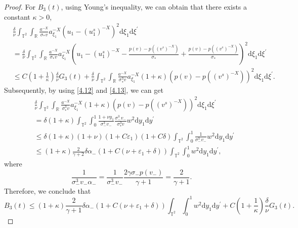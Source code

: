 \documentclass[10pt,reqno]{amsart}
\numberwithin{equation}{section}
\newcommand{\dif}{\mathrm{d}}
\begin{document}
\begin{proof}
For $B_3(t)$, using Young's inequality, we can obtain that there exists a constant $\kappa>0$,
\begin{align*}
&\frac{\delta}{\nu}\int_{\mathbb{T}^2}\int_{\mathbb{R}}\frac{a^{-X}}{\sigma_\ast v}a^{-X}_{\xi_1}\left(u_1-(u_1^s)^{-X}\right)^2\dif \xi_1\dif \xi^{\prime}\\
&=\frac{\delta}{\nu}\int_{\mathbb{T}^2}\int_{\mathbb{R}}\frac{a^{-X}}{\sigma_\ast v}a^{-X}_{\xi_1}\left(u_1-(u_1^s)^{-X}-\frac{p(v)-p((v^s)^{-X})}{\sigma_\ast}
+\frac{p(v)-p((v^s)^{-X})}{\sigma_\ast}\right)^2\dif \xi_1\dif \xi^{\prime}\\
&\le C(1+\frac{1}{\kappa})\frac{\delta}{\nu}G_3(t)+
\frac{\delta}{\nu}\int_{\mathbb{T}^2}\int_{\mathbb{R}}\frac{a^{-X}}{\sigma_\ast^3 v}a^{-X}_{\xi_1}(1+\kappa)\left(p(v)-p((v^s)^{-X})\right)^2\dif \xi_1\dif \xi^{\prime}.
\end{align*}
Subsequently, by using \eqref{4.12} and \eqref{4.13}, we can get
\begin{align*}
&\frac{\delta}{\nu}\int_{\mathbb{T}^2}\int_{\mathbb{R}}\frac{a^{-X}}{\sigma_\ast^3 v}a^{-X}_{\xi_1}(1+\kappa)\left(p(v)-p((v^s)^{-X})\right)^2\dif \xi_1\dif \xi^{\prime}\\
&=\delta(1+\kappa)\int_{\mathbb{T}^2}\int_0^1\frac{1+\nu y_1}{\sigma_-^3 v_-}\frac{\sigma_-^3v_-}{\sigma_\ast^3v}w^2\dif y_1\dif y^{\prime}\\
&\le \delta(1+\kappa)(1+\nu)(1+C\varepsilon_1)(1+C\delta)\int_{\mathbb{T}^2}\int_0^1\frac{1}{\sigma_-^3 v_-}w^2\dif y_1\dif y^{\prime}\\
&\le (1+\kappa)\frac{2}{\gamma+2}\delta\alpha_-(1+C(\nu+\varepsilon_1+\delta))
\int_{\mathbb{T}^2}\int_0^1w^2\dif y_1\dif y^{\prime},
\end{align*}
where
\[
\frac{1}{\sigma_-^3v_-\alpha_-}
=\frac{1}{\sigma_-^3v_-}\frac{2\gamma\sigma_-p(v_-)}{\gamma+1}
=\frac{2}{\gamma+1}.
\]
Therefore, we conclude that
\begin{equation}\label{b3}
B_3(t)\le(1+\kappa)\frac{2}{\gamma+1}\delta\alpha_-(1+C(\nu+\varepsilon_1+\delta))
\int_{\mathbb{T}^2}\int_0^1w^2\dif y_1\dif y^{\prime}
+C(1+\frac{1}{\kappa})\frac{\delta}{\nu}G_3(t).
\end{equation}


\end{proof}
\end{document}
